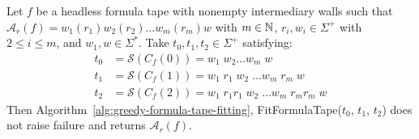 

\begin{theorem}\label{th:greedy-formula-tape-fitting}
    Let $f$ be a headless formula tape with nonempty intermediary walls such that $\mathcal{A}_r(f) = w_1 (r_1) w_2 (r_2)\dots w_m (r_m) w$ with $m\in\mathbb{N}$, $r_i, w_i \in \Sigma^+$ with $2 \leq i \leq m$, and $w_1, w \in \Sigma^*$. Take $t_0, t_1, t_2 \in \Sigma^+$ satisfying:
    \begin{align*}
        t_0 & = \mathcal{S}(C_f(0))  = w_1\; w_2 \dots w_m\; w                       \\
        t_1 & = \mathcal{S}(C_f(1))  = w_1\; r_1\; w_2\; \dots w_m\; r_m\; w         \\
        t_2 & = \mathcal{S}(C_f(2))  = w_1\; r_1 r_1\; w_2\; \dots w_m\; r_m r_m\; w
    \end{align*}
    Then Algorithm~\ref{alg:greedy-formula-tape-fitting}, {\sc FitFormulaTape}($t_0$, $t_1$, $t_2$) does not raise failure and returns $\mathcal{A}_r(f)$.

\end{theorem}
